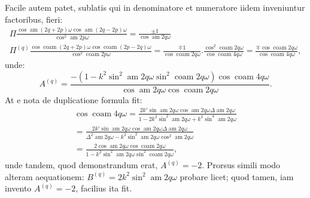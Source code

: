 \documentclass{article}
\begin{document}
Facile autem patet, sublatis qui in denominatore et numeratore iidem inveniuntur factoribus, fieri:
\[
\begin{gathered}
\Pi\frac{\cos\operatorname{am}(2q+2p)\omega\cos\operatorname{am}(2q-2p)\omega}{\cos^{2}\operatorname{am}2p\omega}=\frac{\pm1}{\cos\operatorname{am}2q\omega}\\[1.5ex]
\Pi^{(q)}\frac{\cos\operatorname{coam}(2q+2p)\omega\cos\operatorname{coam}(2p-2q)\omega}{\cos^{2}\operatorname{coam}2p\omega}=\frac{\mp1}{\cos\operatorname{coam}2q\omega}.\frac{\cos^{2}\operatorname{coam}2q\omega}{\cos\operatorname{coam}4q\omega}=\frac{\mp\cos\operatorname{coam}2q\omega}{\cos\operatorname{coam}4q\omega},
\end{gathered}
\]
unde:
\[
A^{(q)}=\frac{-\left(1-k^{2}\sin^{2}\operatorname{am}2q\omega\sin^{2}\operatorname{coam}2q\omega\right)\cos\operatorname{coam}4q\omega}{\cos\operatorname{am}2q\omega\cos\operatorname{coam}2q\omega}.
\]
At e nota de duplicatione formula fit:
\[
\begin{gathered}
\cos\operatorname{coam}4q\omega=\frac{2k'\sin\operatorname{am}2q\omega\cos\operatorname{am}2q\omega\Delta\operatorname{am}2q\omega}{1-2k^{2}\sin^{2}\operatorname{am}2q\omega+k^{2}\sin^{4}\operatorname{am}2q\omega}\\[1.5ex]
=\frac{2k'\sin\operatorname{am}2q\omega\cos\operatorname{am}2q\omega\Delta\operatorname{am}2q\omega}{\Delta^{2}\operatorname{am}2q\omega-k^{2}\sin^{2}\operatorname{am}2q\omega\cos^{2}\operatorname{am}2q\omega}\\[1.5ex]
=\frac{2\cos\operatorname{am}2q\omega\cos\operatorname{coam}2q\omega}{1-k^{2}\sin^{2}\operatorname{am}2q\omega\sin^{2}\operatorname{coam}2q\omega},
\end{gathered}
\]
unde tandem, quod demonstrandum erat, $A^{(q)}=-2$. Prorsus simili modo alteram aequationem: $B^{(q)}=2k^{2}\sin^{2}\operatorname{am}2q\omega$ probare licet; quod tamen, iam invento $A^{(q)}=-2$, facilius ita fit.
\end{document}
